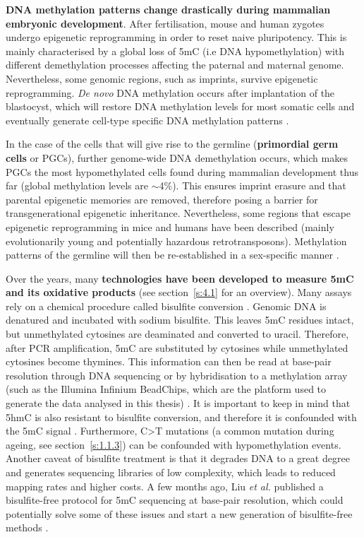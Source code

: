 \bigskip

\textbf{DNA methylation patterns change drastically during mammalian embryonic development}. After fertilisation, mouse and human zygotes undergo epigenetic reprogramming in order to reset naive pluripotency. This is mainly characterised by a global loss of 5mC (i.e DNA hypomethylation) with different demethylation processes affecting the paternal and maternal genome. Nevertheless, some genomic regions, such as imprints, survive epigenetic reprogramming. \textit{De novo} DNA methylation occurs after implantation of the blastocyst, which will restore DNA methylation levels for most somatic cells and eventually generate cell-type specific DNA methylation patterns \cite{Iurlaro2017,Tang2016,Atlasi2017}. 

\bigskip

In the case of the cells that will give rise to the germline (\textbf{primordial germ cells} or \acrshort{PGCs}), further genome-wide DNA demethylation occurs, which makes \acrshort{PGCs} the most hypomethylated cells found during mammalian development thus far (global methylation levels are $\sim$4\%). This ensures imprint erasure and that parental epigenetic memories are removed, therefore posing a barrier for transgenerational epigenetic inheritance. Nevertheless, some regions that escape epigenetic reprogramming in mice and humans have been described (mainly evolutionarily young and potentially hazardous retrotransposons). Methylation patterns of the germline will then be re-established in a sex-specific manner \cite{Tang2016}.  

\bigskip

Over the years, many \textbf{technologies have been developed to measure 5mC and its oxidative products} (see section~\ref{s:4.1} for an overview). Many assays rely on a chemical procedure called bisulfite conversion \cite{Frommer1992}. Genomic DNA is denatured and incubated with sodium bisulfite. This leaves 5mC residues intact, but unmethylated cytosines are deaminated and converted to uracil. Therefore, after PCR amplification, 5mC are substituted by cytosines while unmethylated cytosines become thymines. This information can then be read at base-pair resolution through DNA sequencing or by hybridisation to a methylation array (such as the Illumina Infinium BeadChips, which are the platform used to generate the data analysed in this thesis) \cite{Plongthongkum2014}. It is important to keep in mind that 5hmC is also resistant to bisulfite conversion, and therefore it is confounded with the 5mC signal \cite{Wu2017}. Furthermore, C>T mutations (a common mutation during ageing, see section~\ref{s:1.1.3}) can be confounded with hypomethylation events. Another caveat of bisulfite treatment is that it degrades DNA to a great degree and generates sequencing libraries of low complexity, which leads to reduced mapping rates and higher costs. A few months ago, Liu \textit{et al.} published a bisulfite-free protocol for 5mC sequencing at base-pair resolution, which could potentially solve some of these issues and start a new generation of bisulfite-free methods \cite{Liu2019}. 

